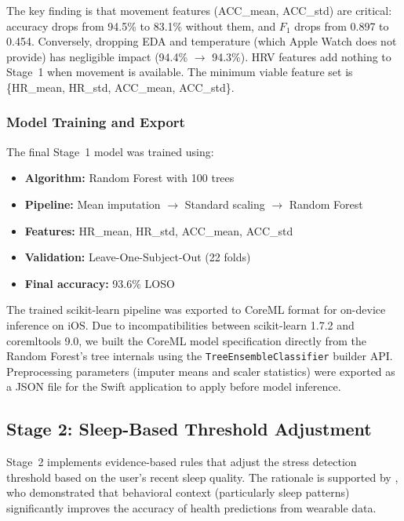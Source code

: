\documentclass[12pt,letterpaper]{article}
\begin{document}
The key finding is that movement features (ACC\_mean, ACC\_std) are critical: accuracy drops from 94.5\% to 83.1\% without them, and $F_1$ drops from 0.897 to 0.454. Conversely, dropping EDA and temperature (which Apple Watch does not provide) has negligible impact (94.4\% $\rightarrow$ 94.3\%). HRV features add nothing to Stage~1 when movement is available. The minimum viable feature set is \{HR\_mean, HR\_std, ACC\_mean, ACC\_std\}.
\vspace*{-1em}
\subsubsection{Model Training and Export}
The final Stage~1 model was trained using:          
\begin{itemize}
    \item \textbf{Algorithm:} Random Forest with 100 trees \citep{breiman2001random}
    \item \textbf{Pipeline:} Mean imputation $\rightarrow$ Standard scaling $\rightarrow$ Random Forest
    \item \textbf{Features:} HR\_mean, HR\_std, ACC\_mean, ACC\_std
    \item \textbf{Validation:} Leave-One-Subject-Out (22 folds)
    \item \textbf{Final accuracy:} 93.6\% LOSO
\end{itemize}


The trained scikit-learn \citep{pedregosa2011sklearn} pipeline was exported to CoreML format \citep{apple2023coreml} for on-device inference on iOS. Due to incompatibilities between scikit-learn 1.7.2 and coremltools 9.0, we built the CoreML model specification directly from the Random Forest's tree internals using the \texttt{TreeEnsembleClassifier} builder API. Preprocessing parameters (imputer means and scaler statistics) were exported as a JSON file for the Swift application to apply before model inference.

\subsection{Stage 2: Sleep-Based Threshold Adjustment}

Stage~2 implements evidence-based rules that adjust the stress detection threshold based on the user's recent sleep quality. The rationale is supported by \cite{apple2024behavioral}, who demonstrated that behavioral context (particularly sleep patterns) significantly improves the accuracy of health predictions from wearable data.
\end{document}
